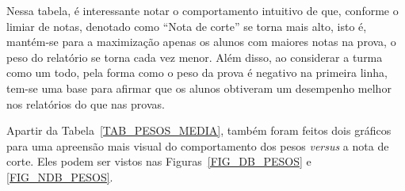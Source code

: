 \documentclass[11pt]{article}
\begin{document}
                Nessa tabela, é interessante notar o
                comportamento intuitivo de que, conforme o
                limiar de notas, denotado como ``Nota de
                corte'' se torna mais alto, isto é,
                mantém-se para a
                maximização apenas os alunos com maiores notas
                na prova, o peso do relatório se torna cada
                vez menor. Além disso, ao considerar
                a turma como um todo, pela
                forma como o peso da prova é negativo na
                primeira linha, tem-se uma base para afirmar
                que os alunos obtiveram um desempenho melhor
                nos relatórios do que nas provas.

                Apartir da Tabela~\ref{TAB_PESOS_MEDIA},
                também foram feitos dois gráficos para uma
                apreensão mais visual do comportamento dos
                pesos \textit{versus} a nota de corte.
                Eles podem ser vistos nas
                Figuras~\ref{FIG_DB_PESOS} e
                \ref{FIG_NDB_PESOS}.
\end{document}
